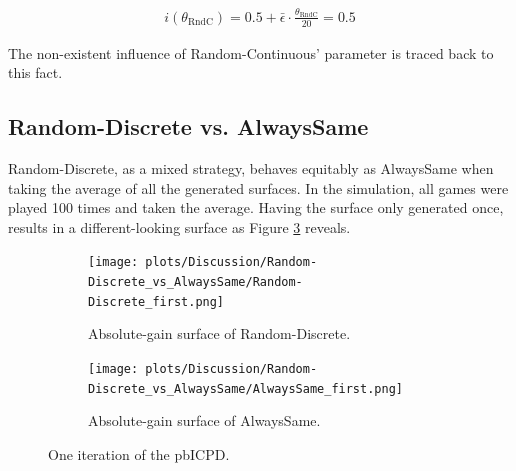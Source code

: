 \documentclass[11pt]{article}
\begin{document}
	\begin{equation}
		\begin{split}
			i(\theta_{\mathrm{RndC}}) = 0.5 + \bar \epsilon \cdot \frac{\theta_{\mathrm{RndC}}}{20} = 0.5
		\end{split}
		\label{eq:i_eq_0.5}
	\end{equation}

	The non-existent influence of Random-Continuous' parameter is traced back to this fact.


\subsection{Random-Discrete vs. AlwaysSame} \label{sec:RndD_vs_AlwS}
	
	Random-Discrete, as a mixed strategy, behaves equitably as AlwaysSame when taking the average of all the generated surfaces.
	In the simulation, all games were played 100 times and taken the average.
	Having the surface only generated once, results in a different-looking surface as Figure \ref{fig:two_one-iter} reveals.\\

	\begin{figure}[h]
		\centering
		\begin{subfigure}[t]{0.45\textwidth}
			\centering
			\texttt{[image: plots/Discussion/Random-Discrete\_vs\_AlwaysSame/Random-Discrete\_first.png]}
			\caption{Absolute-gain surface of Random-Discrete.}
			\label{fig:RNDD_one-iter}
		\end{subfigure}\hfill
		\begin{subfigure}[t]{0.45\textwidth}
			\centering
			\texttt{[image: plots/Discussion/Random-Discrete\_vs\_AlwaysSame/AlwaysSame\_first.png]}\\
			\caption{Absolute-gain surface of AlwaysSame.}
			\label{fig:ALWS_one-iter}
		\end{subfigure}
		\caption{One iteration of the pbICPD.}
		\label{fig:two_one-iter}
	\end{figure}
\end{document}
